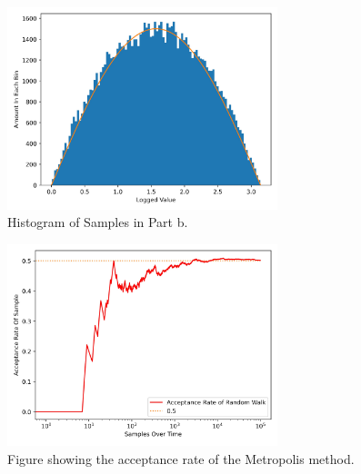 \documentclass[12pt, A4]{article}
\begin{document}
\begin{figure}[H]
  \begin{center}
    \includegraphics[width=0.7\textwidth]{histogram.jpg}
  \end{center}
  \caption{Histogram of Samples in Part b.}
  \label{fig:}
\end{figure}


\begin{figure}[H]
  \begin{center}
    \includegraphics[width=0.7\textwidth]{Acceptance_Rate.jpg}
  \end{center}
  \caption{Figure showing the acceptance rate of the Metropolis method.}
  \label{fig:Acceptance_Rate}
\end{figure}
\end{document}
